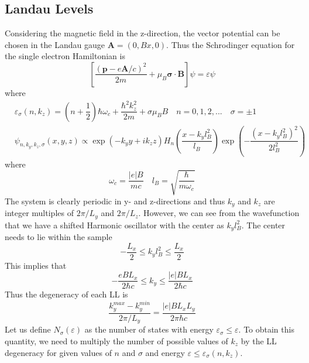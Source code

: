 \documentclass[aps,prb,onecolumn,notitlepage,showpacs,floatfix,superscriptaddress]{revtex4-1}
\begin{document}
\subsection{Landau Levels}
Considering the magnetic field in the z-direction, the vector potential can be chosen in the Landau gauge ${\bm A}=(0, Bx, 0)$. Thus the Schrodinger equation for the single electron Hamiltonian is
\begin{equation}
\left [ \dfrac{({\bm p}-e{\bm A} /c)^2}{2m} + \mu_B {\bm \sigma} \cdot {\bm B} \right] \psi = \varepsilon \psi
\end{equation}
where 
\begin{equation}
\begin{split}
&\varepsilon_{\sigma} (n,k_z)= \left(n+\dfrac{1}{2} \right) \hbar \omega_c + \dfrac{\hbar^2 k_z^2}{2m} + \sigma \mu_B B \quad n=0,1,2,...  \quad \sigma=\pm 1\\
&\psi_{n,k_y,k_z,\sigma}(x,y,z) \propto \exp\left( - k_y y + i k_z z\right) H_n \left( \dfrac{x-k_y l_B^2}{l_B} \right) \exp\left(-  \dfrac{(x-k_y l_B^2)^2}{2 l_B^2}\right)
\end{split}
\end{equation}
where 
\begin{equation}
\omega_c = \dfrac{\vert e \vert B}{m c} \quad  l_B =\sqrt{\dfrac{\hbar}{m \omega_c}}
\end{equation}
The system is clearly periodic in y- and z-directions and thus $k_y$ and $k_z$ are integer multiples of $2\pi/L_y$ and $2\pi/L_z$. However, we can see from the wavefunction that we have a shifted Harmonic oscillator with the center as $k_y l_B^2$. The center needs to lie within the sample
\begin{equation}
-\dfrac{L_x	}{2} \leq k_y l_B^2 \leq \dfrac{L_x}{2}
\end{equation}
This implies that 
\begin{equation}
-\dfrac{e B L_x}{2 \hbar c} \leq k_y  \leq \dfrac{|e| B L_x}{2 \hbar c}
\end{equation}
Thus the degeneracy of each LL is
\begin{equation}
\dfrac{k_y^{max}-k_y^{min}}{2\pi/L_y} = \dfrac{|e| B L_x L_y}{2 \pi \hbar c}
\end{equation}
Let us define $N_\sigma (\varepsilon)$ as the number of states with energy $\varepsilon_\sigma \leq \varepsilon$. To obtain this quantity, we need to multiply the number of possible values of $k_z$ by the LL degeneracy for given values of $n$ and $\sigma$ and energy $\varepsilon \leq \varepsilon_\sigma (n,k_z)$. 
\end{document}
